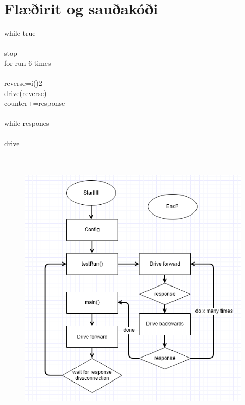 \section{Flæðirit og sauðakóði}
while true\\
{\\
    stop\\
    for run 6 times\\
    {\\
        reverse=i()2\\
        drive(reverse)\\
        counter+=response\\
    }\\
    while respones\\
    {\\
        drive\\
    }\\
}\\
\begin{figure}[h]
\includegraphics[scale=.3]{img/flowchart}
\end{figure}

